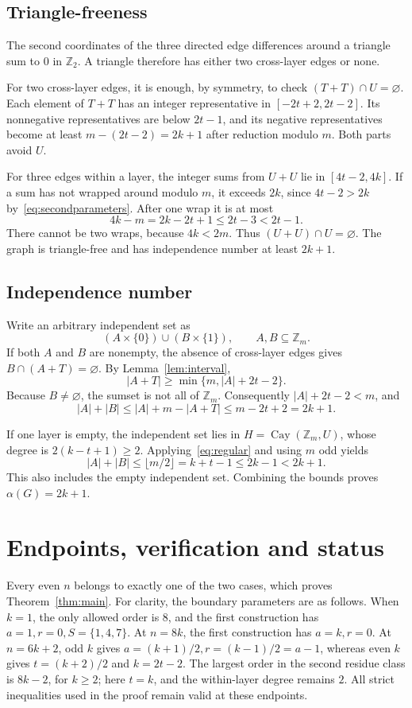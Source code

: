 \documentclass[11pt]{article}
\newcommand{\Z}{\mathbb Z}
\newcommand{\Cay}{\operatorname{Cay}}
\begin{document}
\subsection*{Triangle-freeness}

The second coordinates of the three directed edge differences around a
triangle sum to \(0\) in \(\Z_2\). A triangle therefore has either two
cross-layer edges or none.

For two cross-layer edges, it is enough, by symmetry, to check
\((T+T)\cap U=\varnothing\).
Each element of \(T+T\) has an integer representative in
\([-2t+2,2t-2]\).
Its nonnegative representatives are below \(2t-1\), and its negative
representatives become at least \(m-(2t-2)=2k+1\) after reduction modulo
\(m\). Both parts avoid \(U\).

For three edges within a layer, the integer sums from \(U+U\) lie in
\([4t-2,4k]\).
If a sum has not wrapped around modulo \(m\), it exceeds \(2k\), since
\(4t-2>2k\) by~\eqref{eq:secondparameters}.
After one wrap it is at most
\[
4k-m=2k-2t+1\le2t-3<2t-1.
\]
There cannot be two wraps, because \(4k<2m\).
Thus \((U+U)\cap U=\varnothing\).
The graph is triangle-free and has independence number at least \(2k+1\).

\subsection*{Independence number}

Write an arbitrary independent set as
\[
(A\times\{0\})\cup(B\times\{1\}),\qquad A,B\subseteq\Z_m.
\]
If both \(A\) and \(B\) are nonempty, the absence of cross-layer edges gives
\(B\cap(A+T)=\varnothing\).
By Lemma~\ref{lem:interval},
\[
|A+T|\ge\min\{m,|A|+2t-2\}.
\]
Because \(B\ne\varnothing\), the sumset is not all of \(\Z_m\).
Consequently \(|A|+2t-2<m\), and
\[
|A|+|B|\le |A|+m-|A+T|\le m-2t+2=2k+1.
\]

If one layer is empty, the independent set lies in
\(H=\Cay(\Z_m,U)\), whose degree is
\(2(k-t+1)\ge2\).
Applying~\eqref{eq:regular} and using \(m\) odd yields
\[
|A|+|B|\le\lfloor m/2\rfloor=k+t-1\le2k-1<2k+1.
\]
This also includes the empty independent set.
Combining the bounds proves \(\alpha(G)=2k+1\).

\section{Endpoints, verification and status}

Every even \(n\) belongs to exactly one of the two cases, which proves
Theorem~\ref{thm:main}. For clarity, the boundary parameters are as follows.
When \(k=1\), the only allowed order is \(8\), and the first construction
has \(a=1,r=0,S=\{1,4,7\}\).
At \(n=8k\), the first construction has \(a=k,r=0\).
At \(n=6k+2\), odd \(k\) gives \(a=(k+1)/2,r=(k-1)/2=a-1\),
whereas even \(k\) gives \(t=(k+2)/2\) and \(k=2t-2\).
The largest order in the second residue class is \(8k-2\), for \(k\ge2\);
here \(t=k\), and the within-layer degree remains \(2\).
All strict inequalities used in the proof remain valid at these endpoints.
\end{document}
